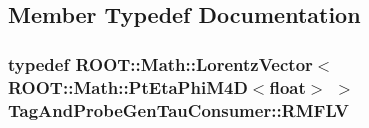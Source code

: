 \subsection{Member Typedef Documentation}
\hypertarget{classTagAndProbeGenTauConsumer_a636381bac6ddb2ac60260203768d9c42}{
\subsubsection[{RMFLV}]{\setlength{\rightskip}{0pt plus 5cm}typedef ROOT::Math::LorentzVector$<$ROOT::Math::PtEtaPhiM4D$<$float$>$ $>$ {\bf TagAndProbeGenTauConsumer::RMFLV}}}
\label{classTagAndProbeGenTauConsumer_a636381bac6ddb2ac60260203768d9c42}


